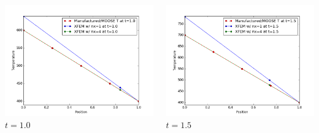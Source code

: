 \documentclass[]{beamer}
\begin{document}
\begin{frame}[t]
\begin{columns}
\begin{center}
			\includegraphics[scale=0.17]{figures/1D_xy_ls1mat_u_vs_x_10}\\
			$t=1.0$
			\end{center}
			\begin{center}
			\includegraphics[scale=0.17]{figures/1D_xy_ls1mat_u_vs_x_15}\\
			$t=1.5$			
			
			\null
			

\end{center}
\end{columns}
\end{frame}
\end{document}
